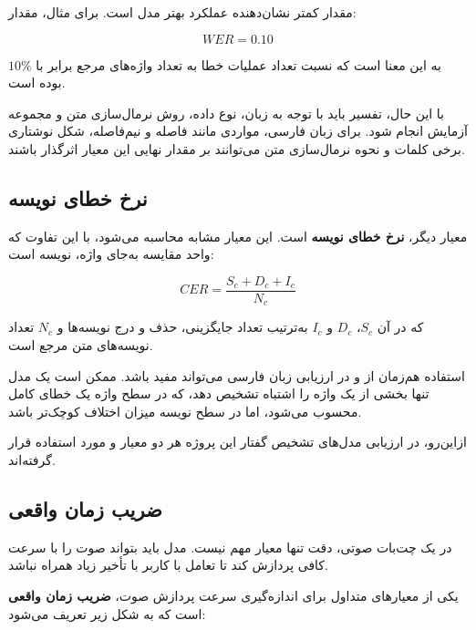 مقدار کمتر  نشان‌دهنده عملکرد بهتر مدل است.
برای مثال، مقدار:

\begin{equation}
WER = 0.10
\end{equation}

به این معنا است که نسبت تعداد عملیات خطا به تعداد واژه‌های
مرجع برابر با $10\%$ بوده است.

با این حال، تفسیر  باید با توجه به زبان،
نوع داده، روش نرمال‌سازی متن و مجموعه آزمایش انجام شود.
برای زبان فارسی، مواردی مانند فاصله و نیم‌فاصله، شکل نوشتاری
برخی کلمات و نحوه نرمال‌سازی متن می‌توانند بر مقدار نهایی
این معیار اثرگذار باشند.


\subsection{نرخ خطای نویسه}

معیار دیگر،
\textbf{نرخ خطای نویسه}
است.
این معیار مشابه  محاسبه می‌شود، با این تفاوت که
واحد مقایسه به‌جای واژه، نویسه است:

\begin{equation}
CER
=
\frac{S_c+D_c+I_c}{N_c}
\end{equation}

که در آن $S_c$، $D_c$ و $I_c$ به‌ترتیب تعداد جایگزینی،
حذف و درج نویسه‌ها و $N_c$ تعداد نویسه‌های متن مرجع است.

استفاده هم‌زمان از  و  در ارزیابی زبان فارسی
می‌تواند مفید باشد.
ممکن است یک مدل تنها بخشی از یک واژه را اشتباه تشخیص دهد،
که در سطح واژه یک خطای کامل محسوب می‌شود، اما در سطح نویسه
میزان اختلاف کوچک‌تر باشد.

ازاین‌رو، در ارزیابی مدل‌های تشخیص گفتار این پروژه هر دو معیار
 و  مورد استفاده قرار گرفته‌اند.


\subsection{ضریب زمان واقعی}

در یک چت‌بات صوتی، دقت تنها معیار مهم نیست.
مدل باید بتواند صوت را با سرعت کافی پردازش کند تا تعامل با
کاربر با تأخیر زیاد همراه نباشد.

یکی از معیارهای متداول برای اندازه‌گیری سرعت پردازش صوت،
\textbf{ضریب زمان واقعی}
است که به شکل زیر تعریف می‌شود:

